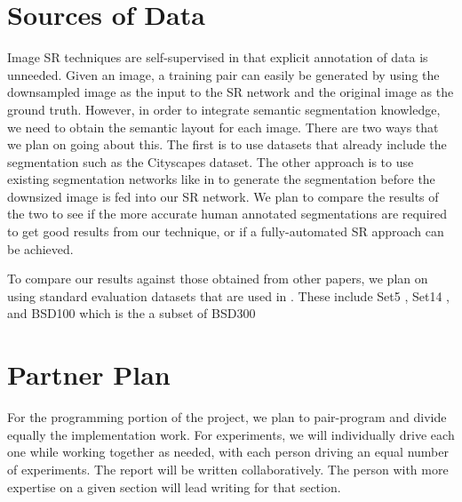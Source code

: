 \documentclass[10pt,twocolumn,letterpaper]{article}
\begin{document}
\section{Sources of Data}
Image SR techniques are self-supervised in that explicit annotation of data is
unneeded. Given an image, a training pair can easily be generated by using the
downsampled image as the input to the SR network and the original image as the
ground truth. However, in order to integrate semantic segmentation knowledge,
we need to obtain the semantic layout for each image. There are two ways that we
plan on going about this. The first is to use datasets that already include
the segmentation such as the Cityscapes \cite{Cityscapes} dataset. The other
approach is to use existing segmentation networks like in
\cite{FullyConvolutionalSS} to generate the segmentation before the downsized
image is fed into our SR network. We plan to compare the results of the two to
see if the more accurate human annotated segmentations are required to get good
results from our technique, or if a fully-automated SR approach can be achieved.

To compare our results against those obtained from other papers, we plan on
using standard evaluation datasets that are used in \cite{SRGAN}. These include
Set5 \cite{Set5}, Set14 \cite{Set14}, and BSD100 which is the a subset of
BSD300 \cite{BSD300}


\section{Partner Plan}
For the programming portion of the project, we plan to pair-program and
divide equally the implementation work. For experiments, we will individually
drive each one while working together as needed, with each person driving an
equal number of experiments. The report will be written collaboratively. The
person with more expertise on a given section will lead writing for that
section.

\end{document}
